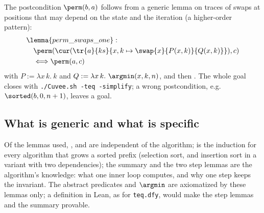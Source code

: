 The postcondition $\perm(b, a)$ follows from a generic lemma on traces of swaps at positions that may
depend on the state and the iteration (a higher-order pattern):
\begin{align*}
  &\lemma{perm\_swaps\_one}:\\
  &\quad \perm(\cur(\tr{a}{ks}{x, k \mapsto \swap{x}{P(x, k)}{Q(x, k)}}), c)\\
  &\quad\Longleftrightarrow \perm(a, c)
\end{align*}
with $P := \lambda x\, k.\ k$ and $Q := \lambda x\, k.\ \argmin(x, k, n)$, and then .
The whole goal closes with \texttt{./Cuvee.sh -teq -simplify}; a wrong postcondition, e.g.
$\sorted(b, 0, n + 1)$, leaves a goal.

\subsection{What is generic and what is specific}

Of the lemmas used, ,  and
 are independent of the algorithm;  is the
induction for every algorithm that grows a sorted prefix (selection sort, and insertion sort in a
variant with two dependencies); the summary  and the two step lemmas are the
algorithm's knowledge: what one inner loop computes, and why one step keeps the invariant. The abstract
predicates and $\argmin$ are axiomatized by these lemmas only; a definition in Lean, as for
\texttt{teq.dfy}, would make the step lemmas and the summary provable.
